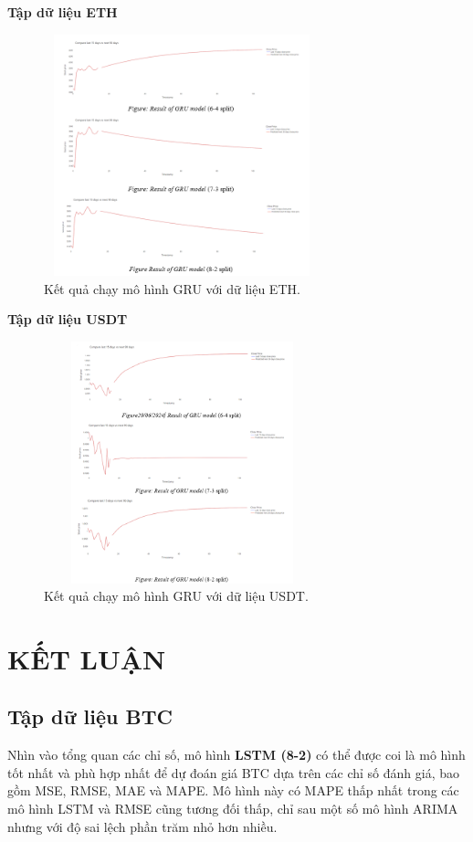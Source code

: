 \documentclass[conference]{IEEEtran}
\begin{document}
\textbf{Tập dữ liệu ETH}
\begin{figure}[H] %
    \centering
    \includegraphics[width=8cm, height=7cm]{Images/Gru-ETH.png} %
    \caption{Kết quả chạy mô hình GRU với dữ liệu ETH.}
    \label{fig:arima-model}
\end{figure}

\textbf{Tập dữ liệu USDT}
\begin{figure}[H] %
    \centering
    \includegraphics[width=8cm, height=7cm]{Images/Gru_USDT.png} %
    \caption{Kết quả chạy mô hình GRU với dữ liệu USDT.}
    \label{fig:arima-model}
\end{figure}

\section{KẾT LUẬN}
\subsection{Tập dữ liệu BTC}
Nhìn vào tổng quan các chỉ số, mô hình \textbf{LSTM (8-2)} có thể được coi là mô hình tốt nhất và phù hợp nhất để dự đoán giá BTC dựa trên các chỉ số đánh giá, bao gồm MSE, RMSE, MAE và MAPE. Mô hình này có MAPE thấp nhất trong các mô hình LSTM và RMSE cũng tương đối thấp, chỉ sau một số mô hình ARIMA nhưng với độ sai lệch phần trăm nhỏ hơn nhiều.
\end{document}
